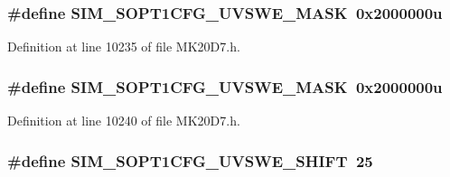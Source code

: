 \subsubsection[{\texorpdfstring{S\+I\+M\+\_\+\+S\+O\+P\+T1\+C\+F\+G\+\_\+\+U\+V\+S\+W\+E\+\_\+\+M\+A\+SK}{SIM_SOPT1CFG_UVSWE_MASK}}]{\setlength{\rightskip}{0pt plus 5cm}\#define S\+I\+M\+\_\+\+S\+O\+P\+T1\+C\+F\+G\+\_\+\+U\+V\+S\+W\+E\+\_\+\+M\+A\+SK~0x2000000u}\hypertarget{group___s_i_m___register___masks_ga29e593e134a31bed2dbd3673c51cb330}{}\label{group___s_i_m___register___masks_ga29e593e134a31bed2dbd3673c51cb330}


Definition at line 10235 of file M\+K20\+D7.\+h.

\subsubsection[{\texorpdfstring{S\+I\+M\+\_\+\+S\+O\+P\+T1\+C\+F\+G\+\_\+\+U\+V\+S\+W\+E\+\_\+\+M\+A\+SK}{SIM_SOPT1CFG_UVSWE_MASK}}]{\setlength{\rightskip}{0pt plus 5cm}\#define S\+I\+M\+\_\+\+S\+O\+P\+T1\+C\+F\+G\+\_\+\+U\+V\+S\+W\+E\+\_\+\+M\+A\+SK~0x2000000u}\hypertarget{group___s_i_m___register___masks_ga29e593e134a31bed2dbd3673c51cb330}{}\label{group___s_i_m___register___masks_ga29e593e134a31bed2dbd3673c51cb330}


Definition at line 10240 of file M\+K20\+D7.\+h.

\subsubsection[{\texorpdfstring{S\+I\+M\+\_\+\+S\+O\+P\+T1\+C\+F\+G\+\_\+\+U\+V\+S\+W\+E\+\_\+\+S\+H\+I\+FT}{SIM_SOPT1CFG_UVSWE_SHIFT}}]{\setlength{\rightskip}{0pt plus 5cm}\#define S\+I\+M\+\_\+\+S\+O\+P\+T1\+C\+F\+G\+\_\+\+U\+V\+S\+W\+E\+\_\+\+S\+H\+I\+FT~25}\hypertarget{group___s_i_m___register___masks_ga74d94a9794e03091f54b76a5c18c58b8}{}\label{group___s_i_m___register___masks_ga74d94a9794e03091f54b76a5c18c58b8}


